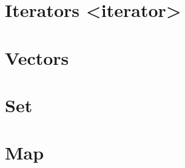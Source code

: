 \documentclass{report}
\begin{document}
    \pagebreak \bigbreak \noindent
    \section{\LARGE Iterators <iterator>}
    \bigbreak \noindent 

    

    \pagebreak \bigbreak \noindent 
    \section{\LARGE Vectors}
    \bigbreak \noindent 

    \pagebreak \bigbreak \noindent 
    \section{\LARGE Set}
    \bigbreak \noindent 

    \pagebreak \bigbreak \noindent 
    \section{\LARGE Map}
    \bigbreak \noindent 




%
%
%     

%
%
%

    
\end{document}

